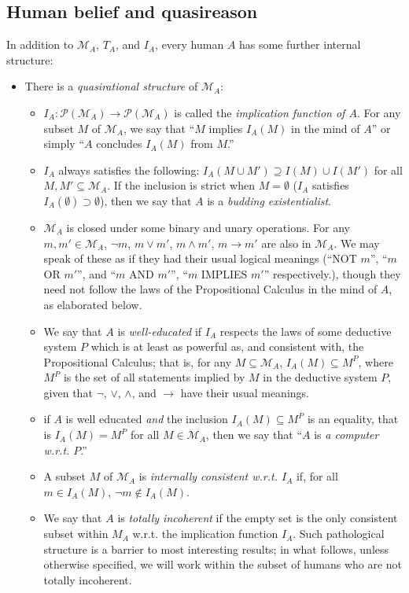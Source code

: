 \documentclass[12pt]{article}
\begin{document}
\subsection{Human belief and quasireason}
In addition to $\mathcal{M}_A$, $T_A$, and $I_A$, every human $A$ has some further internal structure:
\begin{itemize}
\item There is a \textit{quasirational structure} of $\mathcal{M}_A$:
\begin{itemize}
\item $I_A:\mathcal{P}(\mathcal{M}_A)\rightarrow\mathcal{P}(\mathcal{M}_A)$ is called the \textit{implication function of $A$}.  For any subset $M$ of $\mathcal{M}_A$, we say that ``$M$ implies $I_A(M)$ in the mind of $A$'' or simply ``$A$ concludes $I_A(M)$ from $M$.'' 
\item $I_A$ always satisfies the following: $I_A(M\cup M')\supseteq I(M)\cup I(M')$ for all $M,M'\subseteq \mathcal{M}_A$.  If the inclusion is strict when $M=\emptyset$ ($I_A$ satisfies $I_A(\emptyset)\supset\emptyset$), then we say that $A$ is a \textit{budding existentialist}.

\item $\mathcal{M}_A$ is closed under some binary and unary operations.  For any $m,m'\in \mathcal{M}_A$, $\neg m$, $m\vee m'$, $m\wedge m'$, $m\rightarrow m'$ are also in $\mathcal{M}_A$.  We may speak of these as if they had their usual logical meanings (``NOT $m$'', ``$m$ OR $m'$'', and ``$m$ AND $m'$'', ``$m$ IMPLIES $m'$'' respectively.), though they need not follow the laws of the Propositional Calculus in the mind of $A$, as elaborated below.

\item We say that $A$ is \textit{well-educated} if $I_A$ respects the laws of some deductive system $P$ which is at least as powerful as, and consistent with, the Propositional Calculus; that is, for any $M\subseteq\mathcal{M}_A$, $I_A(M)\subseteq M^P$, where $M^P$ is the set of all statements implied by $M$ in the deductive system $P$, given that $\neg$, $\vee$, $\wedge$, and $\rightarrow$ have their usual meanings.
\item if $A$ is well educated \textit{and} the inclusion $I_A(M)\subseteq M^P$ is an equality, that is $I_A(M)=M^P$ for all $M\in\mathcal{M}_A$, then we say that ``$A$ is \textit{a computer w.r.t. $P$}.''

\item A subset $M$ of $\mathcal{M}_A$ is \textit{internally consistent w.r.t. $I_A$} if, for all $m\in I_A(M)$, $\neg m\notin I_A(M)$.
\item We say that $A$ is \textit{totally incoherent} if the empty set is the only consistent subset within $M_A$ w.r.t. the implication function $I_A$.  Such pathological structure is a barrier to most interesting results; in what follows, unless otherwise specified, we will work within the subset of humans who are not totally incoherent.
\end{itemize}


\end{itemize}
\end{document}
